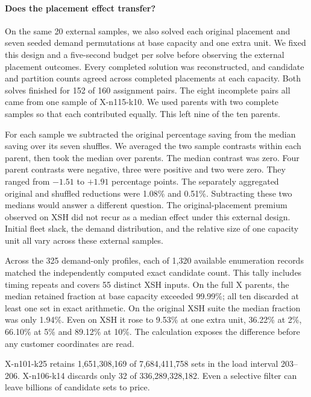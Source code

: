 \documentclass[runningheads]{llncs}
\begin{document}
\paragraph{Does the placement effect transfer?}
On the same 20 external samples, we also solved each original placement and seven seeded demand permutations at base capacity and one extra unit. We fixed this design and a five-second budget per solve before observing the external placement outcomes. Every completed solution was reconstructed, and candidate and partition counts agreed across completed placements at each capacity. Both solves finished for 152 of 160 assignment pairs. The eight incomplete pairs all came from one sample of X-n115-k10. We used parents with two complete samples so that each contributed equally. This left nine of the ten parents.

For each sample we subtracted the original percentage saving from the median saving over its seven shuffles. We averaged the two sample contrasts within each parent, then took the median over parents. The median contrast was zero. Four parent contrasts were negative, three were positive and two were zero. They ranged from $-1.51$ to $+1.91$ percentage points. The separately aggregated original and shuffled reductions were 1.08\% and 0.51\%. Subtracting these two medians would answer a different question. The original-placement premium observed on XSH did not recur as a median effect under this external design. Initial fleet slack, the demand distribution, and the relative size of one capacity unit all vary across these external samples.

Across the 325 demand-only profiles, each of 1,320 available enumeration records matched the independently computed exact candidate count. This tally includes timing repeats and covers 55 distinct XSH inputs. On the full X parents, the median retained fraction at base capacity exceeded 99.99\%; all ten discarded at least one set in exact arithmetic. On the original XSH suite the median fraction was only 1.94\%. Even on XSH it rose to 9.53\% at one extra unit, 36.22\% at 2\%, 66.10\% at 5\% and 89.12\% at 10\%. The calculation exposes the difference before any customer coordinates are read.



X-n101-k25 retains 1,651,308,169 of 7,684,411,758 sets in the load interval 203--206. X-n106-k14 discards only 32 of 336,289,328,182. Even a selective filter can leave billions of candidate sets to price.
\end{document}
